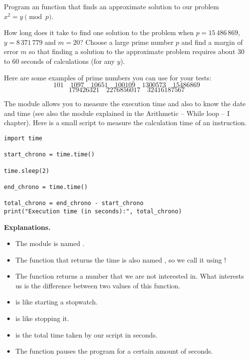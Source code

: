\documentclass[11pt,class=report,crop=false]{standalone}
\begin{document}
\begin{activite}
\begin{enumerate}
	Program an  function that finds an approximate solution to our problem $x^2 = y \pmod{p}$.
	
	How long does it take to find one solution to the problem when $p = 15\,486\,869$, $y = 8\,371\,779$ and $m=20$?
	Choose a large prime number $p$ and find a margin of error $m$ so that finding a solution to the approximate problem requires about 30 to 60 seconds of calculations (for any $y$).

\end{enumerate}
  

Here are some examples of prime numbers you can use for your tests:
$$101 \quad
1097 \quad
10651 \quad
100109 \quad
1300573 \quad
15486869$$
$$179426321 \quad  
2276856017 \quad 
32416187567$$
\end{activite}




\begin{cours}[Stopwatch]


The  module allows you to measure the execution time and also to know the date and time (see also the  module explained in the \og{}Arithmetic -- While loop -- I\fg{} chapter).
Here is a small script to measure the calculation time of an instruction. 

\begin{lstlisting}
import time

start_chrono = time.time()

time.sleep(2)

end_chrono = time.time()

total_chrono = end_chrono - start_chrono
print("Execution time (in seconds):", total_chrono)
\end{lstlisting}


\textbf{Explanations.}
\begin{itemize}
  \item The module is named .
  \item The function that returns the time is also named , so we call it using !
  \item The  function returns a number that we are not interested in. What interests us is the difference between two values of this function. 
  \item {} is like starting a stopwatch.
  \item {} is like stopping it.
  \item {} is the total time taken by our script in seconds.
  \item The  function pauses the program for a certain amount of seconds.
\end{itemize}
\end{cours}
\end{document}
